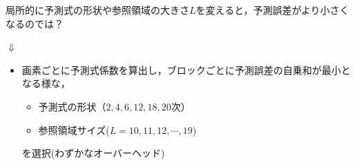 \documentclass[25pt,landscape,dvipdfmx,uplatex]{foils}
\begin{document}
\newpage
局所的に予測式の形状や参照領域の大きさ$L$を変えると，予測誤差がより小さくなるのでは？
\begin{center}
$\Downarrow$
\end{center}
\begin{itemize}
\item \large 画素ごとに予測式係数を算出し，ブロックごとに予測誤差の自乗和が最小となる様な，
\begin{itemize}
  \item 予測式の形状（$2,4,6,12,18,20$次）
  \item 参照領域サイズ($L=10,11,12,\cdots,19$)
 \end{itemize}
を選択(わずかなオーバーヘッド)\\
\end{itemize}

\newpage
\end{document}
